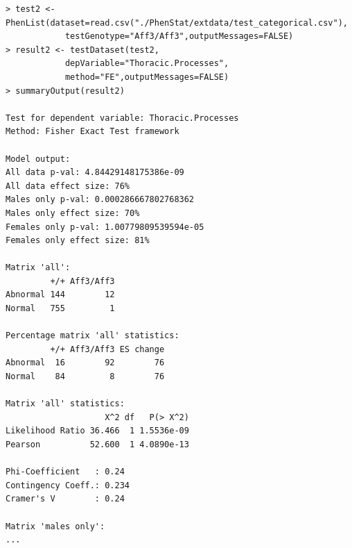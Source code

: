 \documentclass[12pt,a4paper]{article}
\begin{document}
\begingroup
    \fontsize{8pt}{12pt}\selectfont
\begin{verbatim}
> test2 <- PhenList(dataset=read.csv("./PhenStat/extdata/test_categorical.csv"),
            testGenotype="Aff3/Aff3",outputMessages=FALSE)
> result2 <- testDataset(test2,
            depVariable="Thoracic.Processes",
            method="FE",outputMessages=FALSE)  
> summaryOutput(result2)

Test for dependent variable: Thoracic.Processes
Method: Fisher Exact Test framework

Model output:
All data p-val: 4.84429148175386e-09
All data effect size: 76%
Males only p-val: 0.000286667802768362
Males only effect size: 70%
Females only p-val: 1.00779809539594e-05
Females only effect size: 81%

Matrix 'all':
         +/+ Aff3/Aff3
Abnormal 144        12
Normal   755         1

Percentage matrix 'all' statistics:
         +/+ Aff3/Aff3 ES change
Abnormal  16        92        76
Normal    84         8        76

Matrix 'all' statistics:
                    X^2 df   P(> X^2)
Likelihood Ratio 36.466  1 1.5536e-09
Pearson          52.600  1 4.0890e-13

Phi-Coefficient   : 0.24 
Contingency Coeff.: 0.234 
Cramer's V        : 0.24 

Matrix 'males only':
...
\end{verbatim}
\endgroup
\end{document}
